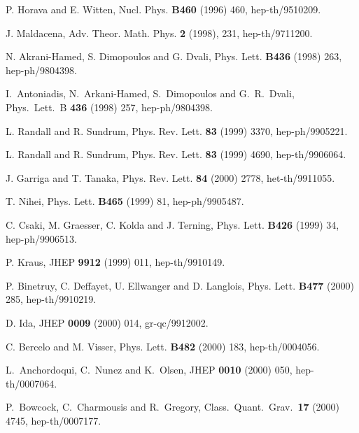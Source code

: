 \documentclass[a4paper,11pt]{article}
\begin{document}
\newpage


\begin{thebibliography}{99}

 P. Horava and E. Witten, Nucl. Phys. {\bf B460} (1996) 460, 
hep-th/9510209.


 J. Maldacena, Adv. Theor. Math. Phys. {\bf 2} (1998), 231, 
hep-th/9711200.

 N. Akrani-Hamed, S. Dimopoulos and G. Dvali, Phys. Lett. 
{\bf B436} (1998) 263, hep-ph/9804398.

I.~Antoniadis, N.~Arkani-Hamed, S.~Dimopoulos and G.~R.~Dvali, Phys.\ Lett.\ B {\bf 436} (1998) 257, hep-ph/9804398.

 L. Randall and R. Sundrum, Phys. Rev. Lett. {\bf 83} (1999) 
3370, hep-ph/9905221.

  L. Randall and R. Sundrum, Phys. Rev. Lett. {\bf 83} (1999)
4690, hep-th/9906064.

J. Garriga and T. Tanaka, Phys. Rev. Lett. {\bf 84} (2000) 2778, het-th/9911055.

T. Nihei, Phys. Lett. {\bf B465} (1999) 81, hep-ph/9905487.

 C. Csaki, M. Graesser, C. Kolda and J. Terning,  Phys. 
Lett. {\bf B426} (1999) 34, hep-ph/9906513.

 P. Kraus, JHEP {\bf 9912} (1999) 011, hep-th/9910149.

 P. Binetruy, C. Deffayet, U. Ellwanger and D. Langlois, 
Phys. Lett. {\bf B477} (2000) 285, hep-th/9910219.
 
 D. Ida, JHEP {\bf 0009} (2000) 014, gr-qc/9912002.

 C. Bercelo and M. Visser, Phys. Lett. {\bf B482} (2000) 183, 
hep-th/0004056.

L.~Anchordoqui, C.~Nunez and K.~Olsen, JHEP {\bf 0010} (2000) 050, hep-th/0007064.

P.~Bowcock, C.~Charmousis and R.~Gregory, Class.\ Quant.\ Grav.\  {\bf 17} (2000) 4745, hep-th/0007177.


\end{thebibliography}
\end{document}
